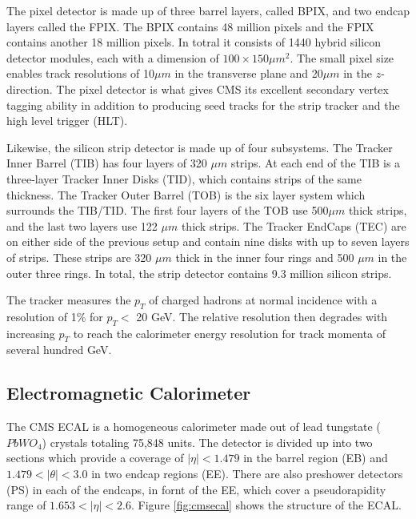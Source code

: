 The pixel detector is made up of three barrel layers, called BPIX, and two endcap layers called the FPIX. The BPIX contains 48 million pixels and the FPIX contains another 18 million pixels. In totral it consists of 1440 hybrid silicon detector modules, each with a dimension of $100 \times 150 \mu m^{2}$. The small pixel size enables track resolutions of 10$\mu m$ in the transverse plane and 20$\mu m$ in the $z$-direction. The pixel detector is what gives CMS its excellent secondary vertex tagging ability in addition to producing seed tracks for the strip tracker and the high level trigger (HLT).

Likewise, the silicon strip detector is made up of four subsystems. The Tracker Inner Barrel (TIB) has four layers of 320 $\mu m$ strips. At each end of the TIB is a three-layer Tracker Inner Disks (TID), which contains strips of the same thickness. The Tracker Outer Barrel (TOB) is the six layer system which surrounds the TIB/TID. The first four layers of the TOB use 500$\mu m$ thick strips, and the last two layers use 122 $\mu m$ thick strips. The Tracker EndCaps (TEC) are on either side of the previous setup and contain nine disks with up to seven layers of strips. These strips are 320 $\mu m$ thick in the inner four rings and 500 $\mu m$ in the outer three rings. In total, the strip detector contains 9.3 million silicon strips.

The tracker measures the $p_{T}$ of charged hadrons at normal incidence with a resolution of 1$\%$ for $p_{T}<$ 20 GeV\cite{Sirunyan_2017}. The relative resolution then degrades with increasing $p_{T}$ to reach the calorimeter energy resolution for track momenta of several hundred GeV.

 \subsection{Electromagnetic Calorimeter}

 The CMS ECAL\cite{CERN-LHCC-97-033} is a homogeneous calorimeter made out of lead tungstate ($PbWO_{4}$) crystals totaling 75,848 units. The detector is divided up into two sections which provide a coverage of $|\eta| < 1.479$ in the barrel region (EB) and $1.479 < |\theta| < 3.0$ in two endcap regions (EE). There are also preshower detectors (PS) in each of the endcaps, in fornt of the EE, which cover a pseudorapidity range of $1.653 < |\eta| < 2.6$. Figure \ref{fig:cmsecal} shows the structure of the ECAL.

